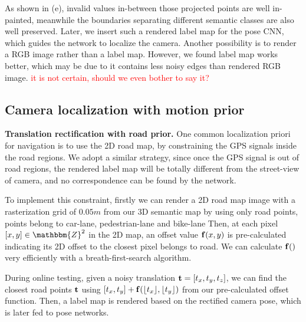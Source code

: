 As shown in (e), invalid values in-between those projected points are well in-painted, meanwhile the boundaries separating different semantic classes are also well preserved. Later, we insert such a rendered label map for the pose CNN, which guides the network to localize the camera.
Another possibility is to render a RGB image rather than a label map. However, we found label map works better, which may be due to it contains less noisy edges than rendered RGB image. \textcolor{red}{it is not certain, should we even bother to say it?}

\subsection{Camera localization with motion prior}

\textbf{Translation rectification with road prior.} One common localization priori for navigation is to use the 2D road map, by constraining the GPS signals inside the road regions. We adopt a similar strategy, since once the GPS signal is out of road regions, the rendered label map will be totally different from the street-view of camera, and no correspondence can be found by the network.

To implement this constraint, firstly we can render a 2D road map image with a rasterization grid of $0.05m$ from our 3D semantic map by using only road points, \ie points belong to car-lane, pedestrian-lane and bike-lane \etc
Then, at each pixel $[x, y] \in \mathbbm{Z}^2$ in the 2D map, an offset value ${\mathbf f}(x, y)$ is pre-calculated indicating its 2D offset to the closest pixel belongs to road. We can calculate ${\mathbf f}()$ very efficiently with a breath-first-search algorithm.

During online testing, given a noisy translation ${\mathbf t}=[t_x, t_y, t_z]$, we can find the closest road points \wrt ${\mathbf t}$ using $[t_x, t_y] + {\mathbf f}(\lfloor t_x \rfloor, \lfloor t_y \rfloor)$ from our pre-calculated offset function. Then, a label map is rendered based on the rectified camera pose, which is later fed to pose networks.

